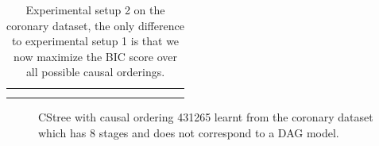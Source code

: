 \documentclass{tufte-book}
\begin{document}
\begin{table}[]
\begin{tabular}{cccccccccccccccc}
                        &                                                                                                  &                                 &                              &                             &                              &                             &                              &                             &                              &                             &                                       &  &  &  &  \\
                        &                                                                                                  &                                 &                              &                             &                              &                             &                              &                             &                              &                             &                                       &  &  &  & 

\caption{Experimental setup 2 on the coronary dataset, the only difference to experimental setup 1 is that we now maximize the BIC score over all possible causal orderings.}
			\end{tabular}
\end{table}



\begin{figure}[]\label{fig:coronary_minstages_nodag}
   \begin{floatrow}
%
\caption{CStree with causal ordering 431265 learnt from the coronary dataset which has 8 stages and does not correspond to a DAG model.}
        
   \end{floatrow}
\end{figure}
\end{document}
